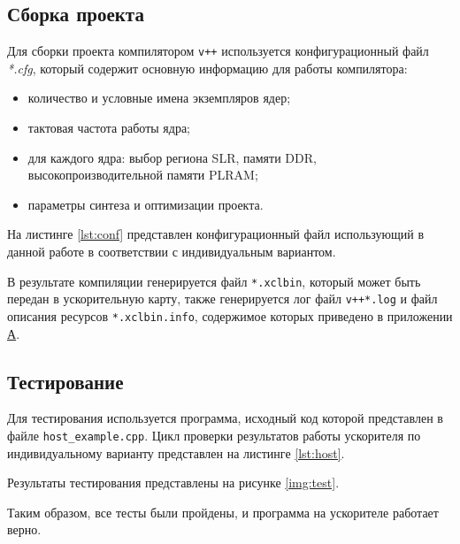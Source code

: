 


\subsection{Сборка проекта}

Для сборки проекта компилятором \texttt{v++} используется конфигурационный файл
\textit{*.cfg}, который содержит основную информацию для работы компилятора:

\begin{itemize}
    \item количество и условные имена экземпляров ядер;
    \item тактовая частота работы ядра;
    \item для каждого ядра: выбор региона SLR, памяти DDR,
          высокопроизводительной памяти PLRAM;
    \item параметры синтеза и оптимизации проекта.
\end{itemize}

На листинге \ref{lst:conf} представлен конфигурационный файл использующий в
данной работе в соответствии с индивидуальным вариантом.


В результате компиляции генерируется файл \texttt{*.xclbin}, который может быть
передан в ускорительную карту, также генерируется лог файл \texttt{v++*.log} и
файл описания ресурсов \texttt{*.xclbin.info}, содержимое которых приведено в
приложении \hyperlink{apA}{А}.

\subsection{Тестирование}

Для тестирования используется программа, исходный код которой представлен в
файле \texttt{host\_example.cpp}. Цикл проверки результатов работы ускорителя по
индивидуальному варианту представлен на листинге \ref{lst:host}.


Результаты тестирования представлены на рисунке \ref{img:test}.


Таким образом, все тесты были пройдены, и программа на ускорителе работает
верно.
